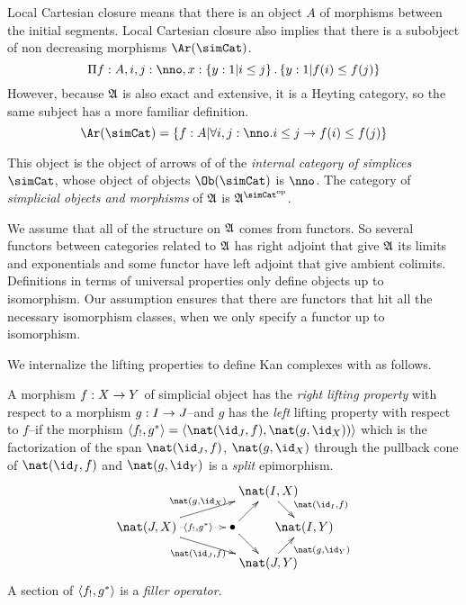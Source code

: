 \documentclass[csh.tex]{subfiles}
\begin{document}
Local Cartesian closure means that there is an object $A$ of morphisms between the initial segments. Local Cartesian closure also implies that there is a subobject of non decreasing morphisms $\Ar(\simCat)$.
\[ \Pi f\of A,i,j\of\nno,x\of\set{y\of 1|i\leq j}.\set{y\of 1|f(i)\leq f(j)}\]
However, because $\mathfrak A$ is also exact and extensive, it is a Heyting category, so the same subject has a more familiar definition.
\[ \Ar(\simCat)=\set{f\of A|\forall i,j\of\nno.i\leq j \to f(i)\leq f(j)} \]

\begin{definition} This object is the object of arrows of of the \emph{internal category of simplices} $\simCat$, whose object of objects $\Ob(\simCat)$ is $\nno$. The category of \emph{simplicial objects and morphisms} of $\mathfrak A$ is $\ambient\s$.
\end{definition}

\begin{remark} We assume that all of the structure on $\mathfrak A$ comes from functors. So several functors between categories related to $\mathfrak A$ has right adjoint that give $\mathfrak A$ its limits and exponentials and some functor have left adjoint that give ambient colimits. Definitions in terms of universal properties only define objects up to isomorphism. Our assumption ensures that there are functors that hit all the necessary isomorphism classes, when we only specify a functor up to isomorphism.
\end{remark}

We internalize the lifting properties to define Kan complexes with as follows.

\begin{definition}
A morphism $f: X\to Y$ of simplicial object has the \emph{right lifting property} with respect to a morphism $g: I\to J$--and $g$ has the \emph{left} lifting property with respect to $f$--if the morphism $\tuplet{f_!,g\ri} = \tuplet{\nat(\id_J,f),\nat(g,\id_X))}$ 
which is the factorization of the span $\nat(\id_J,f)$, $\nat(g,\id_X)$ through the pullback cone of $\nat(\id_I,f)$ and $\nat(g,\id_Y)$
is a \emph{split} epimorphism.
\[\xy
(34,20)*+{\nat(I,X)}="top",(0,10)*+{\nat(J,X)}="left",(24,10)*+{\bullet}="middle",(44,10)*+{\nat(I,Y)}="right",(34,0)*+{\nat(J,Y)}="bottom"
\ar^{\nat(g,\id_X)} "left";"top" \ar@{.>}|(.6){\tuplet{f_!,g\ri}} "left";"middle" \ar_{\nat(\id_J,f)} "left";"bottom" \ar "middle";"bottom"
\ar "middle";"top" \ar^(.6){\nat(\id_I,f)} "top";"right" \ar_(.6){\nat(g,\id_Y)} "bottom";"right"
\endxy\]
A section of $\left\langle f_!,g^* \right\rangle$ is a \emph{filler operator}.\label{lifting}
\end{definition}
\end{document}
